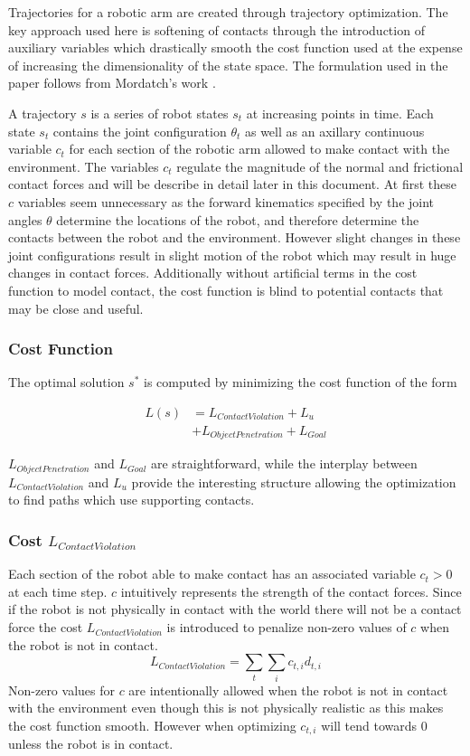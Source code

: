 \documentclass[../thesis.tex]{subfiles}
\begin{document}
Trajectories for a robotic arm are created through trajectory optimization. The key approach used here is softening of contacts through the introduction of auxiliary variables which drastically smooth the cost function used at the expense of increasing the dimensionality of the state space. The formulation used in the paper follows from Mordatch's work \cite{Mordatch2012}.

A trajectory $s$ is a series of robot states $s_t$ at increasing points in time. Each state $s_t$ contains the joint configuration $\theta_t$ as well as an axillary continuous variable $c_t$ for each section of the robotic arm allowed to make contact with the environment. The variables $c_t$ regulate the magnitude of the normal and frictional contact forces and will be describe in detail later in this document. At first these $c$ variables seem unnecessary as the forward kinematics specified by the joint angles $\theta$ determine the locations of the robot, and therefore determine the contacts between the robot and the environment. However slight changes in these joint configurations result in slight motion of the robot which may result in huge changes in contact forces. Additionally without artificial terms in the cost function to model contact, the cost function is blind to potential contacts that may be close and useful. 

\subsubsection{Cost Function}
The optimal solution $s^*$ is computed by minimizing the cost function of the form

\begin{align*}
L(s) &= L_{Contact Violation} + L_{u} \\
&+ L_{Object Penetration} + L_{Goal}   
\end{align*}
    
$L_{Object Penetration}$ and $L_{Goal}$ are straightforward, while the interplay between $L_{Contact Violation}$ and $L_u$ provide the interesting structure allowing the optimization to find paths which use supporting contacts.


\subsubsection{Cost $L_{Contact Violation}$}
Each section of the robot able to make contact has an associated variable $c_t > 0$ at each time step. $c$ intuitively represents the strength of the contact forces. Since if the robot is not physically in contact with the world there will not be a contact force the cost $L_{Contact Violation}$ is introduced to penalize non-zero values of $c$ when the robot is not in contact. 
$$L_{Contact Violation} = \sum_t{\sum_i{c_{t,i} d_{t,i}}}$$
Non-zero values for $c$ are intentionally allowed when the robot is not in contact with the environment even though this is not physically realistic as this makes the cost function smooth. However when optimizing $c_{t,i}$ will tend towards 0 unless the robot is in contact. 
\end{document}
